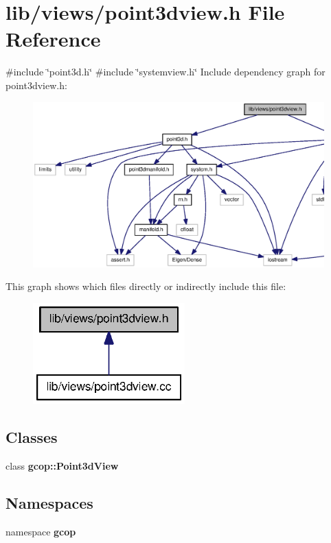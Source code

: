 \section{lib/views/point3dview.h \-File \-Reference}
\label{point3dview_8h}
{\ttfamily \#include \char`\"{}point3d.\-h\char`\"{}}\*
{\ttfamily \#include \char`\"{}systemview.\-h\char`\"{}}\*
\-Include dependency graph for point3dview.\-h\-:
\nopagebreak
\begin{figure}[H]
\begin{center}
\leavevmode
\includegraphics[width=350pt]{point3dview_8h__incl}
\end{center}
\end{figure}
\-This graph shows which files directly or indirectly include this file\-:
\nopagebreak
\begin{figure}[H]
\begin{center}
\leavevmode
\includegraphics[width=166pt]{point3dview_8h__dep__incl}
\end{center}
\end{figure}
\subsection*{\-Classes}
\begin{DoxyCompactItemize}
\item 
class {\bf gcop\-::\-Point3d\-View}
\end{DoxyCompactItemize}
\subsection*{\-Namespaces}
\begin{DoxyCompactItemize}
\item 
namespace {\bf gcop}
\end{DoxyCompactItemize}
